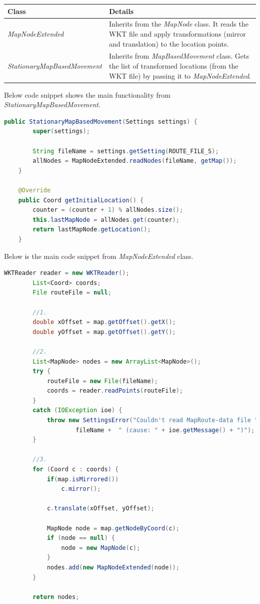 	\begin{center}
	    \begin{tabular}{ | l | p{8.8cm} |}
    		\hline
    		\textbf{Class} & \textbf{Details} \\ \hline
    		\textit{MapNodeExtended} & Inherits from the \textit{MapNode} class. It reads the WKT file and apply transformations (mirror and translation) to the location points. \\ \hline
    		\textit{StationaryMapBasedMovement} & Inherits from \textit{MapBasedMovement} class. Gets the list of transformed locations (from the WKT file) by passing it to \textit{MapNodeExtended}. \\ \hline
    	\end{tabular}
    	 \label{tab:wktMapFiles}

	\end{center}
\vspace{4mm}
Below code snippet shows the main functionality from \textit{StationaryMapBasedMovement}.
\vspace{3mm}
\begin{lstlisting}[language=java]
	public StationaryMapBasedMovement(Settings settings) {
		super(settings);

		String fileName = settings.getSetting(ROUTE_FILE_S);
		allNodes = MapNodeExtended.readNodes(fileName, getMap());
	}

	@Override
	public Coord getInitialLocation() {
		counter = (counter + 1) % allNodes.size();
		this.lastMapNode = allNodes.get(counter);
		return lastMapNode.getLocation();
	}
\end{lstlisting}
\label{lstlisting:node-positioning}
\newpage
Below is the main code snippet from \textit{MapNodeExtended} class.
\vspace{3mm}
\begin{lstlisting}[language=java]
		WKTReader reader = new WKTReader();
		List<Coord> coords;
		File routeFile = null;

		//1.
		double xOffset = map.getOffset().getX();
		double yOffset = map.getOffset().getY();

		//2.
		List<MapNode> nodes = new ArrayList<MapNode>();
		try {
			routeFile = new File(fileName);
			coords = reader.readPoints(routeFile);
		}
		catch (IOException ioe) {
			throw new SettingsError("Couldn't read MapRoute-data file " +
					fileName + 	" (cause: " + ioe.getMessage() + ")");
		}

		//3.
		for (Coord c : coords) {
			if(map.isMirrored())
				c.mirror();

			c.translate(xOffset, yOffset);

			MapNode node = map.getNodeByCoord(c);
			if (node == null) {
				node = new MapNode(c);
			}
			nodes.add(new MapNodeExtended(node));
		}

		return nodes;
\end{lstlisting}
